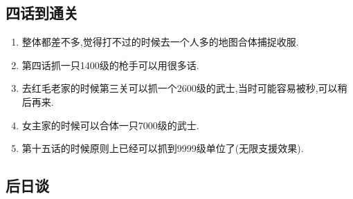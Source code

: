 		\newpage

		\subsection{四话到通关}

		\begin{enumerate}
			\item 整体都差不多,觉得打不过的时候去一个人多的地图合体捕捉收服.

			\item 第四话抓一只1400级的枪手可以用很多话.

			\item 去红毛老家的时候第三关可以抓一个2600级的武士,当时可能容易被秒,可以稍后再来.

			\item 女主家的时候可以合体一只7000级的武士.

			\item 第十五话的时候原则上已经可以抓到9999级单位了(无限支援效果).

		\end{enumerate}
		
		\newpage

		\subsection{后日谈}

